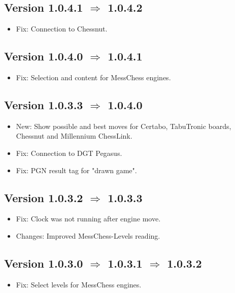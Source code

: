 \documentclass[11pt,a4paper]{article}
\begin{document}
\subsection*{Version 1.0.4.1 $\Rightarrow$  1.0.4.2}
\begin{itemize}		
	\item {\color{red}Fix}: Connection to Chessnut.	
\end{itemize}


\subsection*{Version 1.0.4.0 $\Rightarrow$  1.0.4.1}
\begin{itemize}		
	\item {\color{red}Fix}: Selection and content for MessChess engines.	
\end{itemize}

\subsection*{Version 1.0.3.3 $\Rightarrow$  1.0.4.0}
\begin{itemize}		
    \item {\color{blue}New}: Show possible and best moves for Certabo, TabuTronic boards, Chessnut and Millennium ChessLink.
    \item {\color{red}Fix}: Connection to DGT Pegasus.
	\item {\color{red}Fix}: PGN result tag for "drawn game".
\end{itemize}


\subsection*{Version 1.0.3.2 $\Rightarrow$  1.0.3.3}
\begin{itemize}		
	\item {\color{red}Fix}: Clock was not running after engine move.
	\item {\color{teal}Changes}: Improved MessChess-Levels reading.
\end{itemize}


\subsection*{Version 1.0.3.0 $\Rightarrow$  1.0.3.1 $\Rightarrow$  1.0.3.2}
\begin{itemize}		
	\item {\color{red}Fix}: Select levels for MessChess engines.
\end{itemize}
\end{document}
